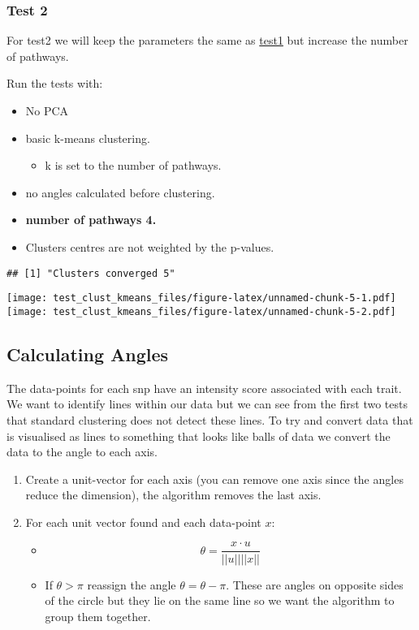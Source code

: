\documentclass[
]{article}
\providecommand{\tightlist}{%
  \setlength{\itemsep}{0pt}\setlength{\parskip}{0pt}}
\begin{document}
\hypertarget{test2}{%
\subsubsection{Test 2}\label{test2}}

For test2 we will keep the parameters the same as
\protect\hyperlink{test1}{test1} but increase the number of pathways.

Run the tests with:

\begin{itemize}
\tightlist
\item
  No PCA
\item
  basic k-means clustering.

  \begin{itemize}
  \tightlist
  \item
    k is set to the number of pathways.
  \end{itemize}
\item
  no angles calculated before clustering.
\item
  \textbf{number of pathways 4.}
\item
  Clusters centres are not weighted by the p-values.
\end{itemize}

\begin{verbatim}
## [1] "Clusters converged 5"
\end{verbatim}

\texttt{[image: test\_clust\_kmeans\_files/figure-latex/unnamed-chunk-5-1.pdf]}
\texttt{[image: test\_clust\_kmeans\_files/figure-latex/unnamed-chunk-5-2.pdf]}

\hypertarget{angles}{%
\subsection{Calculating Angles}\label{angles}}

The data-points for each snp have an intensity score associated with
each trait. We want to identify lines within our data but we can see
from the first two tests that standard clustering does not detect these
lines. To try and convert data that is visualised as lines to something
that looks like balls of data we convert the data to the angle to each
axis.

\begin{enumerate}
\def\labelenumi{\arabic{enumi}.}
\tightlist
\item
  Create a unit-vector for each axis (you can remove one axis since the
  angles reduce the dimension), the algorithm removes the last axis.
\item
  For each unit vector found and each data-point \(x\):

  \begin{itemize}
  \tightlist
  \item
    \[\theta = \frac{x \cdot u}{||u|| ||x||}\]
  \item
    If \(\theta > \pi\) reassign the angle \(\theta= \theta-\pi\). These
    are angles on opposite sides of the circle but they lie on the same
    line so we want the algorithm to group them together.
  \end{itemize}
\end{enumerate}
\end{document}
